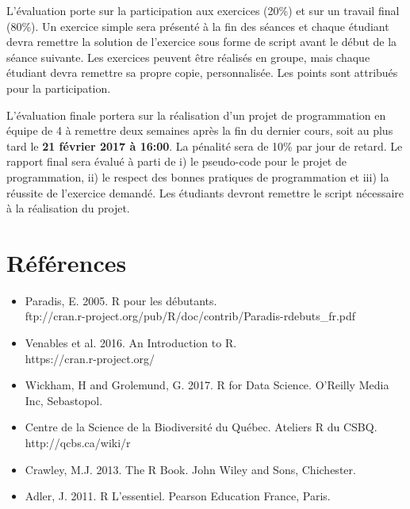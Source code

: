 \documentclass[12]{article}
\begin{document}
	L'évaluation porte sur la participation aux exercices (20\%) et sur un
	travail final (80\%). Un exercice simple sera présenté à la fin des
	séances et chaque étudiant devra remettre la solution de l'exercice sous
	forme de script avant le début de la séance suivante. Les exercices
	peuvent être réalisés en groupe, mais chaque étudiant devra remettre sa
	propre copie, personnalisée. Les points sont attribués pour la
	participation.

	L'évaluation finale portera sur la réalisation d'un projet de
	programmation en équipe de 4 à remettre deux semaines après la fin du
	dernier cours, soit au plus tard le \textbf{21 février 2017 à 16:00}. La
	pénalité sera de 10\% par jour de retard. Le rapport final sera évalué à
	parti de i) le pseudo-code pour le projet de programmation, ii) le respect
	des bonnes pratiques de programmation et iii) la réussite de l'exercice
	demandé. Les étudiants devront remettre le script nécessaire à la
	réalisation du projet.

	\section*{Références}

	\begin{itemize}
	\renewcommand{\labelitemi}{$\bullet$}	

		\item Paradis, E. 2005. R pour les débutants. 
		\\ ftp://cran.r-project.org/pub/R/doc/contrib/Paradis-rdebuts\_fr.pdf

		\item Venables et al. 2016. An Introduction to R. 
		\\ https://cran.r-project.org/

		\item Wickham, H and Grolemund, G. 2017. R for Data Science. O'Reilly Media Inc, Sebastopol.  

		\item Centre de la Science de la Biodiversité du Québec. Ateliers R du CSBQ. \\ http://qcbs.ca/wiki/r

		\item Crawley, M.J. 2013. The R Book. John Wiley and Sons, Chichester.

		\item Adler, J. 2011. R L'essentiel. Pearson Education France, Paris.

	\end{itemize}
\end{document}
